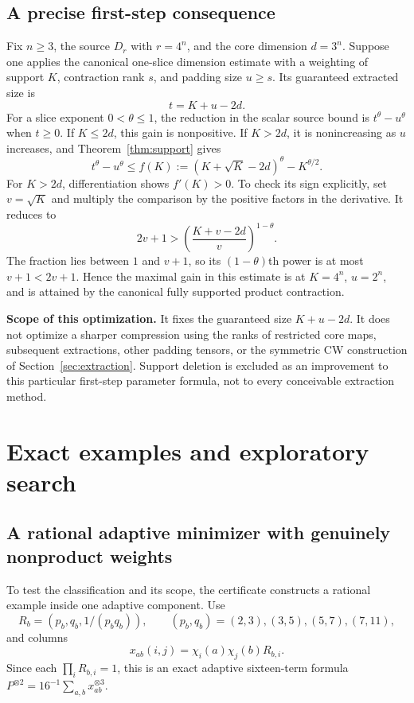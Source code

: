 \documentclass[11pt]{article}
\theoremstyle{definition}\newtheorem{definition}[theorem]{Definition}
\begin{document}
\subsection{A precise first-step consequence}
Fix $n\ge3$, the source $D_r$ with $r=4^n$, and the core dimension $d=3^n$. Suppose one applies the canonical one-slice dimension estimate with a weighting of support $K$, contraction rank $s$, and padding size $u\ge s$. Its guaranteed extracted size is
\[
t=K+u-2d.
\]
For a slice exponent $0<\theta\le1$, the reduction in the scalar source bound is $t^\theta-u^\theta$ when $t\ge0$. If $K\le2d$, this gain is nonpositive. If $K>2d$, it is nonincreasing as $u$ increases, and Theorem~\ref{thm:support} gives
\[
t^\theta-u^\theta\le
f(K):=(K+\sqrt K-2d)^\theta-K^{\theta/2}.
\]
For $K>2d$, differentiation shows $f'(K)>0$. To check its sign explicitly, set $v=\sqrt K$ and multiply the comparison by the positive factors in the derivative. It reduces to
\[
2v+1>\left(\frac{K+v-2d}{v}\right)^{1-\theta}.
\]
The fraction lies between $1$ and $v+1$, so its $(1-\theta)$th power is at most $v+1<2v+1$. Hence the maximal gain in this estimate is at $K=4^n$, $u=2^n$, and is attained by the canonical fully supported product contraction.

\textbf{Scope of this optimization.} It fixes the guaranteed size $K+u-2d$. It does not optimize a sharper compression using the ranks of restricted core maps, subsequent extractions, other padding tensors, or the symmetric CW construction of Section~\ref{sec:extraction}. Support deletion is excluded as an improvement to this particular first-step parameter formula, not to every conceivable extraction method.

\section{Exact examples and exploratory search}\label{sec:experiments}
\subsection{A rational adaptive minimizer with genuinely nonproduct weights}
To test the classification and its scope, the certificate constructs a rational example inside one adaptive component. Use
\[
R_b=(p_b,q_b,1/(p_bq_b)),\qquad
(p_b,q_b)=(2,3),(3,5),(5,7),(7,11),
\]
and columns
\[
x_{ab}(i,j)=\chi_i(a)\chi_j(b)R_{b,i}.
\]
Since each $\prod_iR_{b,i}=1$, this is an exact adaptive sixteen-term formula $P^{\otimes2}=16^{-1}\sum_{a,b}x_{ab}^{\otimes3}$.
\end{document}
